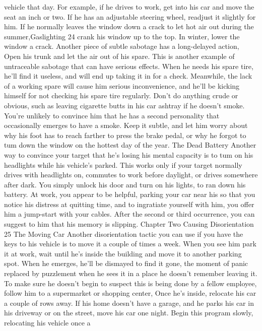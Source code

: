 \documentclass{book}
\begin{document}
vehicle that day. For example, if he drives to work, get into his 
car and move the seat an inch or two. If he has an adjustable 
steering wheel, readjust it slightly for him. If he normally leaves 
the window down a crack to let hot air out during the summer,Gaslighting 
24 
crank his window up to the top. In winter, lower the window a 
crack. 
Another piece of subtle sabotage has a long-delayed action, 
Open his trunk and let the air out of his spare. This is another 
example of untraceable sabotage that can have serious effects. 
When he needs his spare tire, he'll find it useless, and will end 
up taking it in for a check. Meanwhile, the lack of a working 
spare will cause him serious inconvenience, and he'll be kicking 
himself for not checking his spare tire regularly. 
Don't do anything crude or obvious, such as leaving 
cigarette butts in his car ashtray if he doesn’t smoke. You're 
unlikely to convince him that he has a second personality that 
occasionally emerges to have a smoke. Keep it subtle, and let 
him worry about why his foot has to reach farther to press the 
brake pedal, or why he forgot to tum down the window on the 
hottest day of the year. 
The Dead Battery 
Another way to convince your target that he's losing his 
mental capacity is to tum on his headlights while his vehicle's 
parked. This works only if your target normally drives with 
headlights on, commutes to work before daylight, or drives 
somewhere after dark. You simply unlock his door and turn on 
his lights, to ran down his battery. 
At work, you appear to be helpful, parking your car near his 
so that you notice his distress at quitting time, and to ingratiate 
yourself with him, you offer him a jump-start with your cables. 
After the second or third occurrence, you can suggest to him 
that his memory is slipping. 
Chapter Two 
Causing Disorientation 
25 
The Moving Car 
Another disorientation tactic you can use if you have the 
keys to his vehicle is to move it a couple of times a week. When 
you see him park it at work, wait until he's inside the building 
and move it to another parking spot. When he emerges, he'll be 
dismayed to find it gone, the moment of panic replaced by 
puzzlement when he sees it in a place he doesn't remember 
leaving it. 
To make sure he doesn't begin to suspect this is being done 
by a fellow employee, follow him to a supermarket or shopping 
center, Once he's inside, relocate his car a couple of rows away. 
If his home doesn't have a garage, and he parks his car in his 
driveway or on the street, move his car one night. 
Begin this program slowly, relocating his vehicle once a 
\end{document}
